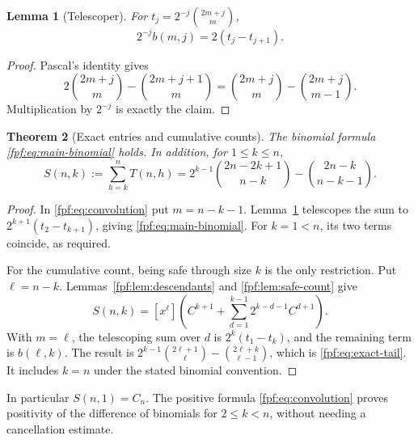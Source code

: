\documentclass[11pt]{article}
\numberwithin{equation}{section}
\newtheorem{theorem}{Theorem}[section]
\newtheorem{lemma}[theorem]{Lemma}
\theoremstyle{definition}
\begin{document}
\begin{lemma}[Telescoper]\label{fpf:lem:telescoper}
For $t_j=2^{-j}\binom{2m+j}{m}$,
\begin{equation}\label{fpf:eq:telescoper}
 2^{-j}b(m,j)=2(t_j-t_{j+1}).
\end{equation}
\end{lemma}
\begin{proof}
Pascal's identity gives
\[
 2\binom{2m+j}{m}-\binom{2m+j+1}{m}
 =\binom{2m+j}{m}-\binom{2m+j}{m-1}.
\]
Multiplication by $2^{-j}$ is exactly the claim.
\end{proof}

\begin{theorem}[Exact entries and cumulative counts]\label{fpf:thm:exact}
The binomial formula \eqref{fpf:eq:main-binomial} holds. In addition, for
$1\le k\le n$,
\begin{equation}\label{fpf:eq:exact-tail}
 \boxed{\displaystyle
 S(n,k):=\sum_{h=k}^n T(n,h)
 =2^{k-1}\binom{2n-2k+1}{n-k}
  -\binom{2n-k}{n-k-1}.}
\end{equation}
\end{theorem}
\begin{proof}
In \eqref{fpf:eq:convolution} put $m=n-k-1$. Lemma~\ref{fpf:lem:telescoper}
telescopes the sum to $2^{k+1}(t_2-t_{k+1})$, giving
\eqref{fpf:eq:main-binomial}. For $k=1<n$, its two terms coincide, as required.

For the cumulative count, being safe through size $k$ is the only
restriction. Put $\ell=n-k$. Lemmas~\ref{fpf:lem:descendants} and
\ref{fpf:lem:safe-count} give
\[
 S(n,k)=[x^\ell]\left(C^{k+1}
           +\sum_{d=1}^{k-1}2^{k-d-1}C^{d+1}\right).
\]
With $m=\ell$, the telescoping sum over $d$ is
$2^k(t_1-t_k)$, and the remaining term is $b(\ell,k)$.
The result is
$2^{k-1}\binom{2\ell+1}{\ell}-\binom{2\ell+k}{\ell-1}$,
which is \eqref{fpf:eq:exact-tail}. It includes $k=n$ under the stated
binomial convention.
\end{proof}
In particular $S(n,1)=C_n$. The positive formula
\eqref{fpf:eq:convolution} proves positivity of the difference of binomials for
$2\le k<n$, without needing a cancellation estimate.
\end{document}

